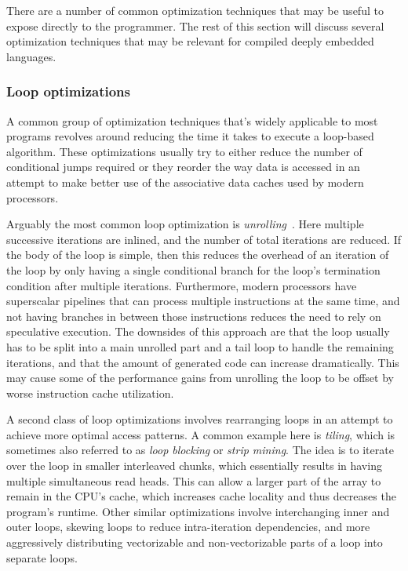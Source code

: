 \documentclass[fontsize=11pt,a4paper,parskip=half,numbers=noenddot]{scrartcl}
\begin{document}
There are a number of common optimization techniques that may be useful to
expose directly to the programmer. The rest of this section will discuss several
optimization techniques that may be relevant for compiled deeply embedded
languages.

\subsubsection{Loop optimizations}


A common group of optimization techniques that's widely applicable to most
programs revolves around reducing the time it takes to execute a loop-based
algorithm. These optimizations usually try to either reduce the number of
conditional jumps required or they reorder the way data is accessed in an
attempt to make better use of the associative data caches used by modern
processors.

Arguably the most common loop optimization is
\emph{unrolling}~\cite{velkoski2014performance}. Here multiple successive
iterations are inlined, and the number of total iterations are reduced. If the
body of the loop is simple, then this reduces the overhead of an iteration of
the loop by only having a single conditional branch for the loop's termination
condition after multiple iterations. Furthermore, modern processors have
superscalar pipelines that can process multiple instructions at the same time,
and not having branches in between those instructions reduces the need to rely
on speculative execution. The downsides of this approach are that the loop
usually has to be split into a main unrolled part and a tail loop to handle the
remaining iterations, and that the amount of generated code can increase
dramatically. This may cause some of the performance gains from unrolling the
loop to be offset by worse instruction cache utilization.

A second class of loop optimizations involves rearranging loops in an attempt to
achieve more optimal access patterns. A common example here is \emph{tiling},
which is sometimes also referred to as \emph{loop blocking} or \emph{strip
  mining}. The idea is to iterate over the loop in smaller interleaved chunks,
which essentially results in having multiple simultaneous read heads. This can
allow a larger part of the array to remain in the CPU's cache, which increases
cache locality and thus decreases the program's runtime. Other similar
optimizations involve interchanging inner and outer loops, skewing loops to
reduce intra-iteration dependencies, and more aggressively distributing
vectorizable and non-vectorizable parts of a loop into separate loops.
\end{document}
